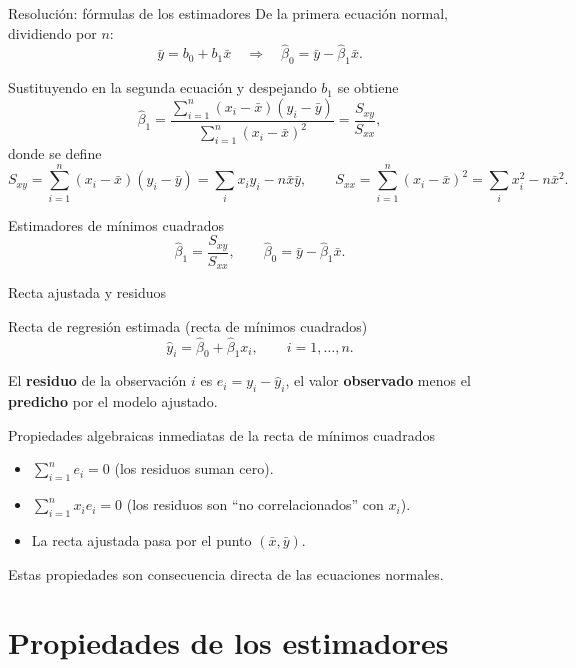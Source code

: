 \documentclass[aspectratio=169,11pt]{beamer}
\begin{document}
\begin{frame}{Resolución: fórmulas de los estimadores}
De la primera ecuación normal, dividiendo por $n$:
\[
\bar y = b_0 + b_1 \bar x \quad\Longrightarrow\quad \hat\beta_0 = \bar y - \hat\beta_1 \bar x.
\]

Sustituyendo en la segunda ecuación y despejando $b_1$ se obtiene
\[
\hat\beta_1 = \frac{\displaystyle\sum_{i=1}^n (x_i-\bar x)(y_i - \bar y)}{\displaystyle\sum_{i=1}^n (x_i - \bar x)^2} = \frac{S_{xy}}{S_{xx}},
\]
donde se define
\[
S_{xy} = \sum_{i=1}^n (x_i-\bar x)(y_i-\bar y) = \sum_i x_iy_i - n\bar x\bar y, \qquad
S_{xx} = \sum_{i=1}^n (x_i-\bar x)^2 = \sum_i x_i^2 - n\bar x^2.
\]

\begin{alertblock}{Estimadores de mínimos cuadrados}
\[
\hat\beta_1 = \frac{S_{xy}}{S_{xx}}, \qquad \hat\beta_0 = \bar y - \hat\beta_1 \bar x.
\]
\end{alertblock}
\end{frame}

\begin{frame}{Recta ajustada y residuos}
\begin{block}{Recta de regresión estimada (recta de mínimos cuadrados)}
\[
\hat y_i = \hat\beta_0 + \hat\beta_1 x_i, \qquad i=1,\dots,n.
\]
\end{block}

\begin{definition}
El \textbf{residuo} de la observación $i$ es $e_i = y_i - \hat y_i$, el valor \textbf{observado} menos el \textbf{predicho} por el modelo ajustado.
\end{definition}

\begin{block}{Propiedades algebraicas inmediatas de la recta de mínimos cuadrados}
\begin{itemize}
\item $\displaystyle\sum_{i=1}^n e_i = 0$ (los residuos suman cero).
\item $\displaystyle\sum_{i=1}^n x_i e_i = 0$ (los residuos son ``no correlacionados'' con $x_i$).
\item La recta ajustada pasa por el punto $(\bar x,\bar y)$.
\end{itemize}
Estas propiedades son consecuencia directa de las ecuaciones normales.
\end{block}
\end{frame}

\section{Propiedades de los estimadores}
\end{document}
